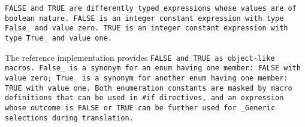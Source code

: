 \tt{FALSE} and \tt{TRUE} are differently typed
expressions whose values are of boolean nature.
\tt{FALSE} is an integer constant expression with type \tt{False_} and value zero.
\tt{TRUE}  is an integer constant expression with type \tt{True_}  and value one.

\note The reference implementation provides
\tt{FALSE} and \tt{TRUE} as object-like macros.
\tt{False_} is a synonym for an \tt{enum} having one member:
\tt{FALSE}  with value zero;
\tt{True_}  is a synonym for another \tt{enum} having one member:
\tt{TRUE}   with value one.
Both enumeration constants are masked by macro
definitions that can be used in \tt{#if} directives,
and an expression whose outcome is \tt{FALSE} or \tt{TRUE} can
be further used for \tt{_Generic} selections during translation.
